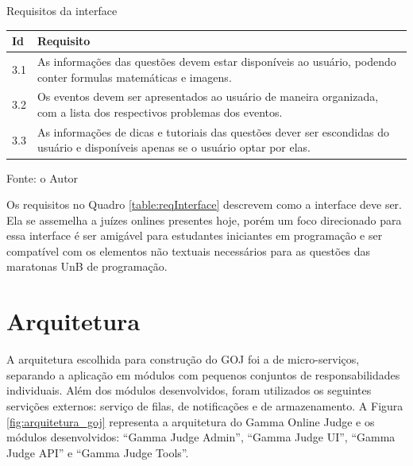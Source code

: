 \begin{quadro}
    \caption{Requisitos da interface}
    \centering
    \label{table:reqInterface}
    \begin{threeparttable}
    \begin{tabular}{ |p{0.6cm}|p{10cm}|  }
        \hline
        
        \textbf{Id} & 
        \textbf{Requisito} \\
        \hline
        
        3.1 & 
        As informações das questões devem estar disponíveis ao usuário, podendo conter formulas matemáticas e imagens. \\
        \hline
        
        3.2 & 
        Os eventos devem ser apresentados ao usuário de maneira organizada, com a lista dos respectivos problemas dos eventos.  \\ 
        \hline
        
        3.3 & 
        As informações de dicas e tutoriais das questões dever ser escondidas do usuário e disponíveis apenas se o usuário optar por elas.  \\
        \hline
    \end{tabular}
        \medskip
    \begin{tablenotes}
        \centering
        \item Fonte: o Autor
    \end{tablenotes}
    \end{threeparttable}

\end{quadro}

Os requisitos no Quadro \ref{table:reqInterface} descrevem como a interface deve ser. Ela se assemelha a juízes onlines presentes hoje, porém um foco direcionado para essa interface é ser amigável para estudantes iniciantes em programação e ser compatível com os elementos não textuais necessários para as questões das maratonas UnB de programação.

\section{Arquitetura}
\label{sec:arquitetura}

A arquitetura escolhida para construção do GOJ foi a de micro-serviços, separando a aplicação em módulos com pequenos conjuntos de responsabilidades individuais. Além dos módulos desenvolvidos, foram utilizados os seguintes servições externos: serviço de filas, de notificações e de armazenamento. A Figura \ref{fig:arquitetura_goj} representa a arquitetura do Gamma Online Judge e os módulos desenvolvidos: ``Gamma Judge Admin'', ``Gamma Judge UI'', ``Gamma Judge API'' e ``Gamma Judge Tools''.

